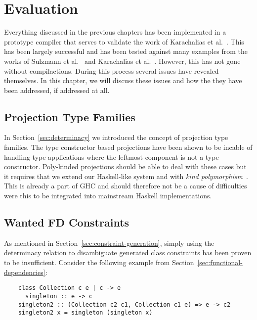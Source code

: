 \chapter{Evaluation}
\label{cha:evalutation}

Everything discussed in the previous chapters has been implemented in a
prototype compiler that serves to validate the work of Karachalias et
al.~\cite{Karachalias:2017:EFD:3156695.3122966}. This has been largely
successful and has been tested against many examples from the works of Sulzmann
et al.~\cite{fundeps-chrs} and Karachalias et
al.~\cite{Karachalias:2017:EFD:3156695.3122966}.
However, this has not gone without compilactions. During this process several
issues have revealed themselves. In this chapter, we will discuss these issues and
how the they have been addressed, if addressed at all.

\section{Projection Type Families}

In Section~\ref{sec:determinacy} we introduced the concept of projection type
families. The type constructor based projections have been shown to be incable
of handling type applications where the leftmost component is not a type
constructor. Poly-kinded projections should be able to deal with these cases but
it requires that we extend our Haskell-like system and \systemfc with
\textit{kind polymorphism}~\cite{yorgey}. This is already a part of GHC and
should therefore not be a cause of difficulties were this to be integrated into
mainstream Haskell implementations.

\section{Wanted FD Constraints}
\label{sec:wanted-fd-constraints}

As mentioned in Section~\ref{sec:constraint-generation}, simply using the
determinacy relation to disambiguate generated class constraints has been proven
to be insufficient. Consider the following example from
Section~\ref{sec:functional-dependencies}:

\begin{verbatim}
    class Collection c e | c -> e
      singleton :: e -> c
    singleton2 :: (Collection c2 c1, Collection c1 e) => e -> c2
    singleton2 x = singleton (singleton x)
\end{verbatim}

